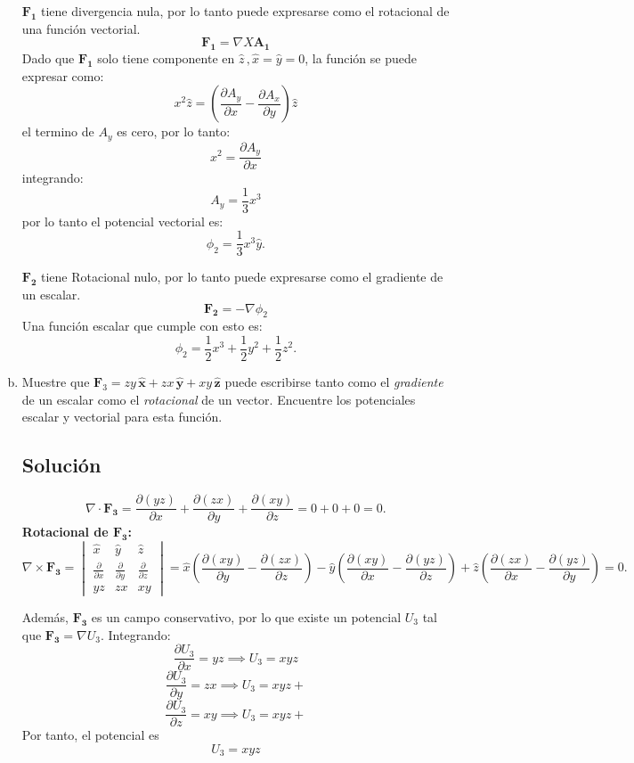 \documentclass[12pt]{article}
\begin{document}
\begin{enumerate}[(a)]
    \(\mathbf{F_1}\) tiene divergencia nula, por lo tanto puede expresarse como el rotacional de una función vectorial.
    \[\mathbf{F_1} = \nabla X \mathbf{A_1}  \]
    Dado que \(\mathbf{F_1}\) solo tiene componente en \(\hat{z} \,, \hat{x}=\hat{y}=0\), la función se puede expresar como:
    \[x^2 \hat{z} = \left( \frac{\partial A_y}{\partial x} -\frac{\partial A_x}{\partial y}  \right)\hat{z} \]
    el termino de \(A_  y\) es cero, por lo tanto:
    \[x^2  = \frac{\partial A_y}{\partial x} \]
    integrando:
    \[A_y = \frac{1}{3}x^3 \]
    por lo tanto el potencial vectorial es:
    \[
    \boxed{\phi_2 = \frac{1}{3}x^3 \hat{y}.}
    \]

    
    \(\mathbf{F_2}\) tiene Rotacional nulo, por lo tanto puede expresarse como el gradiente de un escalar.\\
    \[\mathbf{F_2} = -\nabla\phi_2 \]
    Una función escalar que cumple con esto es:
    \[
    \boxed{\phi_2 = \frac{1}{2}x^3 + \frac{1}{2}y^2 + \frac{1}{2}z^2.}
    \]




    \item Muestre que 
    \( \mathbf{F}_3 = zy\,\hat{\mathbf{x}} + zx\,\hat{\mathbf{y}} + xy\,\hat{\mathbf{z}}\)
    puede escribirse tanto como el \emph{gradiente} de un escalar como el \emph{rotacional} de un vector. 
    Encuentre los potenciales escalar y vectorial para esta función.
    \subsection*{Solución}

   
    \[
    \nabla \cdot \mathbf{F_3} = \frac{\partial (yz)}{\partial x} + \frac{\partial (zx)}{\partial y} + \frac{\partial (xy)}{\partial z} = 0 + 0 + 0 = 0.
    \]
    \textbf{Rotacional de \(\mathbf{F_3} \):}
    \[
    \nabla \times \mathbf{F_3}  = \begin{vmatrix}
    \hat{x} & \hat{y} & \hat{z} \\
    \frac{\partial}{\partial x} & \frac{\partial}{\partial y} & \frac{\partial}{\partial z} \\
    yz & zx & xy
    \end{vmatrix} = \hat{x} \left(\frac{\partial (xy)}{\partial y} - \frac{\partial (zx)}{\partial z}\right) - \hat{y} \left(\frac{\partial (xy)}{\partial x} - \frac{\partial (yz)}{\partial z}\right) + \hat{z} \left(\frac{\partial (zx)}{\partial x} - \frac{\partial (yz)}{\partial y}\right) = 0.
    \]


    Además, \(\mathbf{F_3} \) es un campo conservativo, por lo que existe un potencial \(U_3\) tal que \(\mathbf{F_3} = \nabla U_3\). Integrando:
    \[
    \frac{\partial U_3}{\partial x} = yz \implies U_3 = xyz  
    \]
    \[
    \frac{\partial U_3}{\partial y} = zx \implies U_3 = xyz + 
    \]
    \[
    \frac{\partial U_3}{\partial z} = xy \implies U_3 = xyz + 
    \]
    Por tanto, el potencial es 
    \[\boxed{U_3 = xyz}\]
    

\end{enumerate}
\end{document}
